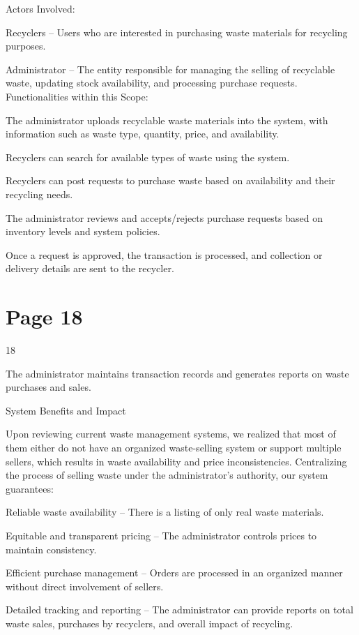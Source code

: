 \documentclass{article}
\begin{document}
Actors Involved: 
 
Recyclers – Users who are interested in purchasing waste materials for recycling purposes. 
 
Administrator – The entity responsible for managing the selling of recyclable waste, updating 
stock availability, and processing purchase requests. 
Functionalities within this Scope: 
 
The administrator uploads recyclable waste materials into the system, with information such as 
waste type, quantity, price, and availability. 
 
Recyclers can search for available types of waste using the system. 
 
Recyclers can post requests to purchase waste based on availability and their recycling needs. 
 
The administrator reviews and accepts/rejects purchase requests based on inventory levels and 
system policies. 
 
Once a request is approved, the transaction is processed, and collection or delivery details are 
sent to the recycler. 
 

\section*{Page 18}
   
 
 18  
 
The administrator maintains transaction records and generates reports on waste purchases and 
sales. 
 
System Benefits and Impact 
 
Upon reviewing current waste management systems, we realized that most of them either do 
not have an organized waste-selling system or support multiple sellers, which results in waste 
availability and price inconsistencies. Centralizing the process of selling waste under the 
administrator's authority, our system guarantees: 
 
Reliable waste availability – There is a listing of only real waste materials. 
 
Equitable and transparent pricing – The administrator controls prices to maintain consistency. 
 
Efficient purchase management – Orders are processed in an organized manner without direct 
involvement of sellers. 
 
Detailed tracking and reporting – The administrator can provide reports on total waste sales, 
purchases by recyclers, and overall impact of recycling. 
 
\end{document}
